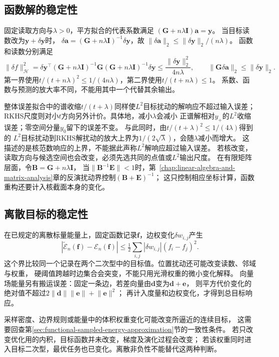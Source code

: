 \subsection{函数解的稳定性}
\label{sec:functional-solution-stability}

固定读取方向与$\lambda>0$，平方拟合的代表系数满足
$(\bm G+n\lambda\bm I)\bm a=\bm y$。
当目标读数改为$\bm y+\delta\bm y$时，
$\delta\bm a=(\bm G+n\lambda\bm I)^{-1}\delta\bm y$，故
$\lVert\delta\bm a\rVert_2\leq\lVert\delta\bm y\rVert_2/(n\lambda)$。
函数和读数分别满足
\[
 \lVert\delta f\rVert_{\mathcal H}^2
 =\delta\bm y^\top(\bm G+n\lambda\bm I)^{-1}
      \bm G(\bm G+n\lambda\bm I)^{-1}\delta\bm y
 \leq\frac{\lVert\delta\bm y\rVert_2^2}{4n\lambda},
 \qquad
 \lVert\bm G\delta\bm a\rVert_2\leq\lVert\delta\bm y\rVert_2.
\]
第一界使用$t/(t+n\lambda)^2\leq1/(4n\lambda)$，第二界使用$t/(t+n\lambda)\leq1$。
系数、函数与预测的放大率不同，不能用其中一个代替其余输出。

整体误差拟合中的谱收缩$t/(t+\lambda)$同样使$L^2$目标扰动的解响应不超过输入误差；
RKHS尺度则对小$t$方向另外计价。具体地，减小$\lambda$会减小
正谱解相对$y_+$的$L^2$收缩误差；零空间分量$y_0$留下的误差不变。
与此同时，由$t/(t+\lambda)^2\leq1/(4\lambda)$得到的
$L^2$目标扰动到RKHS解扰动的放大上界为$1/(2\sqrt\lambda)$，会随$\lambda$减小而增大。
这描述的是核范数响应的上界，不能据此声称$L^2$解响应超过输入误差。
若核改变，读取方向与候选空间也会改变，必须先选共同的点值或$L^2$输出尺度。
在有限矩阵层面，令$\bm B=\bm G+n\lambda\bm I$，
当$\lVert\bm B^{-1}\bm E\rVert<1$时，第~\ref{chap:linear-algebra-and-matrix-analysis}章的反演扰动界控制$(\bm B+\bm E)^{-1}$；
这只控制相应坐标计算，函数重构还要计入核截面本身的变化。

\subsection{离散目标的稳定性}
\label{sec:functional-discrete-objective-stability}

在已规定的离散标量能量上，固定函数记录$\bm f$，边权变化$\delta w_{i,j}$产生
\[
 |\widetilde{\mathcal E}_n(\bm f)-\mathcal E_n(\bm f)|
 \leq\tfrac12\sum_{i,j}|\delta w_{i,j}|(f_i-f_j)^2.
\]
这个界比较同一个记录在两个二次型中的目标值。位置扰动还可能改变读数、邻域与权重，
硬阈值跨越时边集合会突变，不能只用光滑权重的微小变化解释。
向量场能量另有搬运误差：固定一条边，若差向量由$\bm d$变为$\bm d+\bm e$，
则平方代价变化的绝对值不超过$2\lVert\bm d\rVert\lVert\bm e\rVert+\lVert\bm e\rVert^2$；
再计入度量和边权变化，才得到总目标响应。

采样密度、边界规则或能量中的体积权重变化可能改变所逼近的连续目标，
这需要回查第\ref{sec:functional-sampled-energy-approximation}节的一致性条件。
若只改变优化用的内积，目标函数并未改变，梯度及演化过程会改变；
若该权重同时进入目标二次型，最优任务也已变化。离散非负性不能替代这两种判断。

